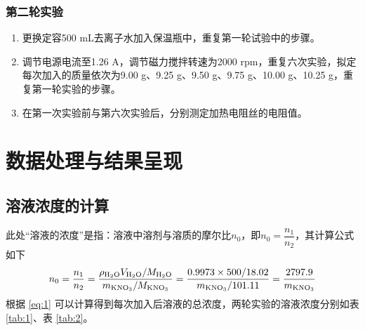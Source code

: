 \documentclass[cn,hazy,pku,12pt,normal,math=newtx,cite=super]{elegantnote}
\begin{document}
\subsubsection{第二轮实验}

\begin{enumerate}
    \item 更换定容500 \si{mL}去离子水加入保温瓶中，重复第一轮试验中的步骤。
    \item 调节电源电流至1.26 \si{A}，调节磁力搅拌转速为2000 \si{rpm}，重复六次实验，拟定每次加入的质量依次为9.00 \si{g}、9.25 \si{g}、9.50 \si{g}、9.75 \si{g}、10.00 \si{g}、10.25 \si{g}，重复第一轮实验的步骤。
    \item 在第一次实验前与第六次实验后，分别测定加热电阻丝的电阻值。
\end{enumerate}


\section{数据处理与结果呈现}


\subsection{溶液浓度的计算}

此处“溶液的浓度”是指：溶液中溶剂与溶质的摩尔比$n_0$，即$n_0=\dfrac{n_1}{n_2}$，其计算公式如下
\begin{equation}
    n_0=\frac{n_1}{n_2}=\frac{\rho_{\ce{H_2O}}V_{\ce{H_2O}}/M_{\ce{H_2O}}}{m_{\ce{KNO_3}}/M_{\ce{KNO_3}}}=\frac{0.9973\times500/18.02}{m_{\ce{KNO_3}}/101.11} = \frac{2797.9}{m_{\ce{KNO_3}}}
    \label{eq:1}
\end{equation}
根据 \ref{eq:1} 可以计算得到每次加入后溶液的总浓度，两轮实验的溶液浓度分别如表 \ref{tab:1}、表 \ref{tab:2}。
\end{document}
